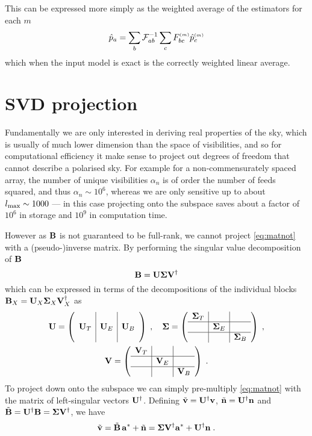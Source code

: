 \documentclass[prd,twocolumn,nofootinbib]{revtex4}
\begin{document}
This can be expressed more simply as the weighted average of the estimators for
each $m$
\begin{equation}
\hat{p}_a = \sum_{b} \mathcal{F}_{ab}^{-1} \sum_c F_{bc}^{\scriptscriptstyle \left(m\right)} \hat{p}_c^{\scriptscriptstyle \left(m\right)} 
\end{equation}
which when the input model is exact is the correctly weighted linear average.


\section{SVD projection}

Fundamentally we are only interested in deriving real properties of the sky,
which is usually of much lower dimension than the space of visibilities, and so
for computational efficiency it make sense to project out degrees of freedom
that cannot describe a polarised sky. For example for a non-commensurately
spaced array, the number of unique visibilities $\alpha_n$ is of order the
number of feeds squared, and thus $\alpha_n \sim 10^6$, whereas we are only
sensitive up to about $l_{\text{max}} \sim 1000$ --- in this case projecting onto the
subspace saves about a factor of $10^6$ in storage and $10^9$ in computation
time.

However as $\mathbf{B}$ is not guaranteed to be full-rank, we cannot project
\eqref{eq:matnot} with a (pseudo-)inverse matrix. By performing the singular
value decomposition of $\mathbf{B}$
\begin{equation}
\mathbf{B} = \mathbf{U} \mathbf{\Sigma} \mathbf{V}^\dagger
\end{equation}
which can be expressed in terms of the decompositions of the individual blocks
$\mathbf{B}_X = \mathbf{U}_X \mathbf{\Sigma}_X \mathbf{V}^{\dagger}_X$ as
\begin{gather}
\mathbf{U} =  \left(\begin{array}{c|c|c} & & \\ \mathbf{U}_T & \mathbf{U}_E & \mathbf{U}_B \\ &
    &\end{array}\right) \; , \quad
\mathbf{\Sigma} =  \left(\begin{array}{c|c|c} \mathbf{\Sigma}_T & & \\ \hline & \mathbf{\Sigma}_E & \\
    \hline & & \mathbf{\Sigma}_B \end{array}\right)
 \; , \\
\mathbf{V} =  \left(\begin{array}{c|c|c} \mathbf{V}_T & & \\ \hline & \mathbf{V}_E & \\
    \hline & & \mathbf{V}_B\end{array}\right) \; .
\end{gather}
To project down onto the subspace we can simply pre-multiply \eqref{eq:matnot}
with the matrix of left-singular vectors $\mathbf{U}^\dagger$. Defining $\tilde{\mathbf{v}} =
\mathbf{U}^\dagger \mathbf{v}$, $\tilde{\mathbf{n}} = \mathbf{U}^\dagger \mathbf{n}$ and $\tilde{\mathbf{B}} = \mathbf{U}^\dagger \mathbf{B} = \mathbf{\Sigma}
\mathbf{V}^\dagger$, we have
\begin{equation}
\label{eq:matnot2}
\tilde{\mathbf{v}} = \tilde{\mathbf{B}}\, \mathbf{a}^* + \tilde{\mathbf{n}} = \mathbf{\Sigma} \mathbf{V}^\dagger \mathbf{a}^* + \mathbf{U}^\dagger \mathbf{n} \; .
\end{equation}
\end{document}
